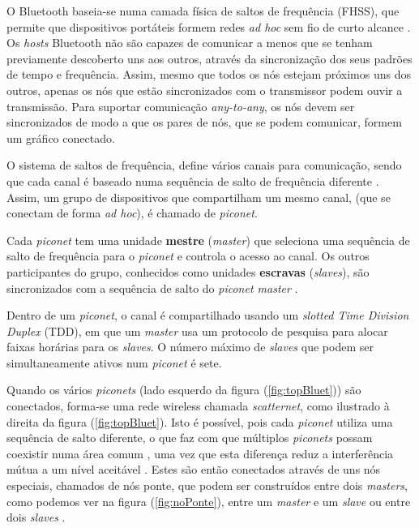 \documentclass[conference]{IEEEtran}
\begin{document}
O Bluetooth baseia-se numa camada física de saltos de frequência (FHSS), que permite que dispositivos portáteis formem redes \textit{ad hoc} sem fio de curto alcance \cite{salonidis2005distributed}. 
Os \textit{hosts} Bluetooth não são capazes de comunicar a menos que se tenham previamente descoberto uns aos outros, através da sincronização dos seus padrões de tempo e frequência. 
Assim, mesmo que todos os nós estejam próximos uns dos outros, apenas os nós que estão sincronizados com o transmissor podem ouvir a transmissão.
Para suportar comunicação \textit{any-to-any}, os nós devem ser sincronizados de modo a que os pares de nós, que se podem comunicar, formem um gráfico conectado.

O sistema de saltos de frequência, define vários canais para comunicação, sendo que cada canal é baseado numa sequência de salto de frequência diferente \cite{salonidis2005distributed}. 
Assim, um grupo de dispositivos que compartilham um mesmo canal, (que se conectam de forma \textit{ad hoc}), é chamado de \textit{piconet}. 

Cada \textit{piconet} tem uma unidade \textbf{mestre} (\textit{master}) que seleciona uma sequência de salto de frequência para o \textit{piconet} e controla o acesso ao canal. 
Os outros participantes do grupo, conhecidos como unidades \textbf{escravas} (\textit{slaves}), são sincronizados com a sequência de salto do \textit{piconet master} \cite{salonidis2005distributed}. 

Dentro de um \textit{piconet}, o canal é compartilhado usando um \textit{slotted Time Division Duplex} (TDD), em que um \textit{master} usa um protocolo de pesquisa para alocar faixas horárias para os \textit{slaves}. O número máximo de \textit{slaves} que podem ser simultaneamente ativos num \textit{piconet} é sete.

Quando os vários \textit{piconets} (lado esquerdo da figura (\ref{fig:topBluet})) são conectados, forma-se uma rede wireless chamada \textit{scatternet}, como ilustrado à direita da figura (\ref{fig:topBluet}).
Isto é possível, pois cada \textit{piconet} utiliza uma sequência de salto diferente, o que faz com que múltiplos \textit{piconets} possam coexistir numa área comum \cite{salonidis2005distributed}, uma vez que esta diferença reduz a interferência mútua a um nível aceitável \cite{prasad2004ofdm}. 
Estes são então conectados através de uns nós especiais, chamados de nós ponte, que podem ser construídos entre dois \textit{masters}, como podemos ver na figura (\ref{fig:noPonte}), entre um \textit{master} e um \textit{slave} ou entre dois \textit{slaves} \cite{salonidis2005distributed}.
\end{document}
